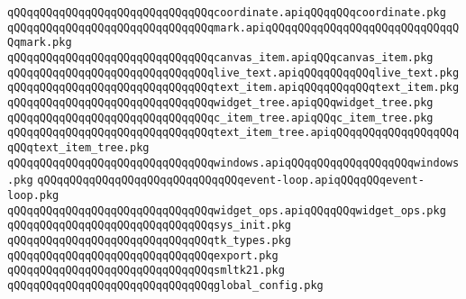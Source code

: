 \verb|qQQqqQQqqQQqqQQqqQQqqQQqqQQqqQQqcoordinate.apiqQQqqQQqcoordinate.pkg|\newline
\verb|qQQqqQQqqQQqqQQqqQQqqQQqqQQqqQQqmark.apiqQQqqQQqqQQqqQQqqQQqqQQqqQQqqQQqmark.pkg|\newline
\verb|qQQqqQQqqQQqqQQqqQQqqQQqqQQqqQQqcanvas_item.apiqQQqcanvas_item.pkg|\newline
\verb|qQQqqQQqqQQqqQQqqQQqqQQqqQQqqQQqlive_text.apiqQQqqQQqqQQqlive_text.pkg|\newline
\verb|qQQqqQQqqQQqqQQqqQQqqQQqqQQqqQQqtext_item.apiqQQqqQQqqQQqtext_item.pkg|\newline
\verb|qQQqqQQqqQQqqQQqqQQqqQQqqQQqqQQqwidget_tree.apiqQQqwidget_tree.pkg|\newline
\verb|qQQqqQQqqQQqqQQqqQQqqQQqqQQqqQQqc_item_tree.apiqQQqc_item_tree.pkg|\newline
\verb|qQQqqQQqqQQqqQQqqQQqqQQqqQQqqQQqtext_item_tree.apiqQQqqQQqqQQqqQQqqQQqqQQqtext_item_tree.pkg|\newline
\verb|qQQqqQQqqQQqqQQqqQQqqQQqqQQqqQQqwindows.apiqQQqqQQqqQQqqQQqqQQqwindows.pkg|\newline
\verb|qQQqqQQqqQQqqQQqqQQqqQQqqQQqqQQqevent-loop.apiqQQqqQQqevent-loop.pkg|\newline
\verb|qQQqqQQqqQQqqQQqqQQqqQQqqQQqqQQqwidget_ops.apiqQQqqQQqwidget_ops.pkg|\newline
\newline
\verb|qQQqqQQqqQQqqQQqqQQqqQQqqQQqqQQqsys_init.pkg|\newline
\verb|qQQqqQQqqQQqqQQqqQQqqQQqqQQqqQQqtk_types.pkg|\newline
\verb|qQQqqQQqqQQqqQQqqQQqqQQqqQQqqQQqexport.pkg|\newline
\verb|qQQqqQQqqQQqqQQqqQQqqQQqqQQqqQQqsmltk21.pkg|\newline
\verb|qQQqqQQqqQQqqQQqqQQqqQQqqQQqqQQqglobal_config.pkg|\newline

